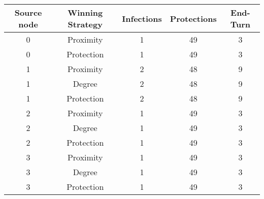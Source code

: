 \documentclass[results.tex]{subfiles}
\begin{document}
    \begin{center}
        \begin{tabular}{| c || c | c | c | c |}
            \hline
            {\bfseries Source node} & {\bfseries Winning Strategy} & {\bfseries Infections} & {\bfseries Protections}
            & {\bfseries End-Turn}
            \\  %
            \hline\hline
            0                       & Proximity                    & 1                      & 49                      & 3                    \\
            \hline
            0                       & Protection                   & 1                      & 49                      & 3                    \\
            \hline
            1                       & Proximity                    & 2                      & 48                      & 9                    \\
            \hline
            1                       & Degree                       & 2                      & 48                      & 9                    \\
            \hline
            1                       & Protection                   & 2                      & 48                      & 9                    \\
            \hline
            2                       & Proximity                    & 1                      & 49                      & 3                    \\
            \hline
            2                       & Degree                       & 1                      & 49                      & 3                    \\
            \hline
            2                       & Protection                   & 1                      & 49                      & 3                    \\
            \hline
            3                       & Proximity                    & 1                      & 49                      & 3                    \\
            \hline
            3                       & Degree                       & 1                      & 49                      & 3                    \\
            \hline
            3                       & Protection                   & 1                      & 49                      & 3                    \\

\end{tabular}
\end{center}
\end{document}

